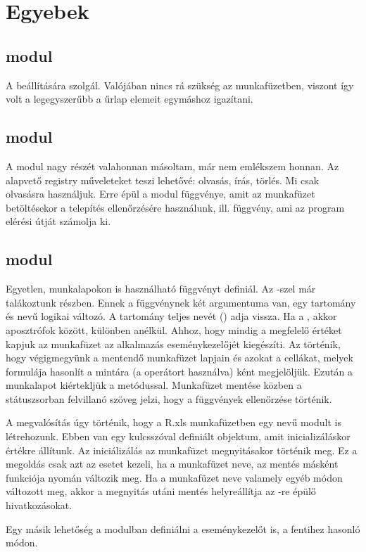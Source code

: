 \section{Egyebek}\label{sec:5.7}

\subsection{ modul}
A  beállítására szolgál. Valójában nincs rá
szükség az  munkafüzetben, viszont így volt a legegyszerűbb a
 űrlap elemeit egymáshoz igazítani. 


\subsection{ modul}
A modul nagy részét valahonnan másoltam, már nem emlékszem honnan. Az
alapvető registry műveleteket teszi lehetővé: olvasás, írás,
törlés. Mi csak olvasásra használjuk. Erre 
épül a modul  függvénye, amit az 
munkafüzet betöltésekor a telepítés 
ellenőrzésére használunk, ill.  függvény, ami az
 program elérési útját számolja ki.

\subsection{ modul}
Egyetlen, munkalapokon is használható függvényt definiál. Az
-szel már talákoztunk  részben. Ennek a
függvénynek két argumentuma van, egy tartomány és  
nevű logikai változó. A tartomány teljes nevét () adja vissza.
Ha a , akkor aposztrófok között, különben anélkül.
Ahhoz, hogy mindig a megfelelő értéket kapjuk az  munkafüzet az
 alkalmazás  eseménykezelőjét
kiegészíti. Az történik, hogy végigmegyünk a mentendő munkafüzet lapjain és azokat a cellákat, melyek formulája hasonlít a 
mintára (a  operátort használva) ként
megjelöljük. Ezután a munkalapot kiértekljük a 
metódussal. Munkafüzet mentése közben a státuszsorban felvillanó
szöveg jelzi, hogy a  függvények ellenőrzése történik.

A megvalósítás úgy történik, hogy a R.xls munkafüzetben egy 
nevű  modult is létrehozunk. Ebben van egy
 kulcsszóval definiált  objektum, amit 
inicializáláskor  értékre állítunk. Az
iniciálizálás az  munkafüzet 
megnyitásakor történik meg.
Ez a megoldás csak azt az esetet kezeli, ha a munkafüzet neve, az
 mentés másként 
funkciója nyomán változik meg. Ha a munkafüzet neve valamely egyéb
módon változott meg, akkor a megnyitás utáni mentés helyreállítja az -re épülő hivatkozásokat.

Egy másik lehetőség a  modulban definiálni a 
eseménykezelőt is, a fentihez 
hasonló módon.

\endinput

